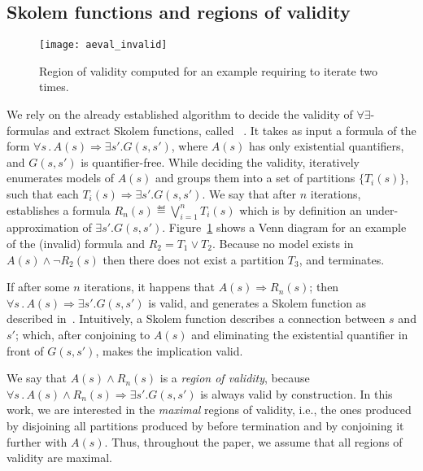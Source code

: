 \subsection{Skolem functions and regions of validity}
\label{sec:aeval}

\begin{figure}[!t]
\centering
\texttt{[image: aeval\_invalid]}
\caption{Region of validity computed for an example requiring \aeval to iterate two times.}
\label{fg:aeval}
\end{figure}


We rely on the already established algorithm to decide the validity of $\forall\exists$-formulas and extract Skolem functions, called \aeval~\cite{fedyukovich2015automated}.
It takes as input a formula of the form $\forall s \,.\,  A(s) \Rightarrow \exists s' . G(s,s')$, 
where $A(s)$ has only existential quantifiers, and $G(s,s')$ is quantifier-free.
While deciding the validity, \aeval iteratively enumerates models of $A(s)$ and groups them into a set of partitions $\{T_i(s)\}$, such that each $T_i(s) \Rightarrow \exists s' . G (s, s')$.
We say that after $n$ iterations, \aeval establishes a formula $R_n(s) \eqdef \bigvee_{i=1}^n T_i(s)$ which is by definition an under-approximation of $\exists s' . G (s, s')$.
Figure~\ref{fg:aeval} shows a Venn diagram for an example of the (invalid) formula and $R_2 = T_1 \lor T_2$.
Because no model exists in $A(s) \land \neg{R_2(s)}$ then there does not exist a partition $T_3$, and \aeval terminates.

If after some $n$ iterations, it happens that $A(s) \Rightarrow R_n(s)$; then $\forall s \,.\,  A(s) \Rightarrow \exists s' . G(s,s')$ is valid, and \aeval generates a Skolem function as described in~\cite{katis2016synthesis}.
Intuitively, a Skolem function describes a connection between $s$ and $s'$; which, after conjoining to $A(s)$ and eliminating the existential quantifier in front of $G(s,s')$, makes the implication valid.

We say that $A(s) \land R_n(s)$ is a \emph{region of validity}, because $\forall s \,.\,  A(s) \land R_n(s) \Rightarrow \exists s' . G(s,s')$ is always valid by construction.
In this work, we are interested in the \emph{maximal} regions of validity, i.e., the ones produced by disjoining all partitions produced by \aeval before termination and by conjoining it further with $A(s)$.
Thus, throughout the paper, we assume that all regions of validity are maximal. 

